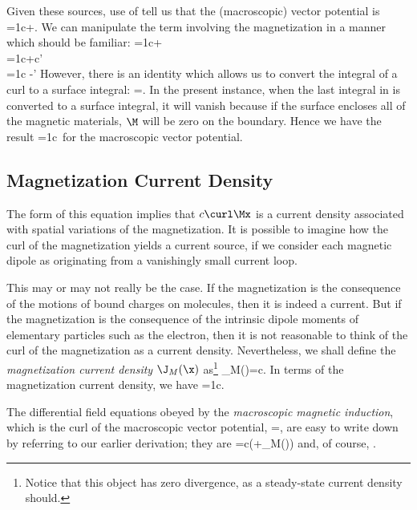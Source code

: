 {Given these sources, use of  tell us that the (macroscopic)
vector potential is
\beq
\Ax=\frac1c\inivp\leb\frac\Jxp\xxpa+\rib.
\eeq
We can manipulate the term involving the magnetization in a manner which
should be familiar:
\beqa
\Ax=\frac1c\inivp\lec\frac\Jxp\xxpa+\ric
\nonumber\\=\frac1c\inivp\lec\frac\Jxp\xxpa+c\Mxp\times\grad'\lep{}\xxpa
\rip\ric\nonumber\\=\frac1c\inivp\lec{}\xxpa\ric
-\inivp\grad'\times\lep\frac\Mxp\xxpa\rip
\eeqa
However, there is an identity which allows us to convert the integral of a
curl to a surface integral:
\beq
\inv\curl\V=\inac\nn\times\V.
\eeq
In the present instance, when the last integral in  is converted to a
surface integral, it will vanish because if the surface encloses all of the
magnetic materials, $\M$ will be zero on the boundary. Hence we have the
result
\beq
\Ax=\frac1c\inivp\,\xxpa
\eeq
for the macroscopic vector potential.

\subsection{Magnetization Current Density}

The form of this equation implies that $c\curl\Mx$ is a current density 
associated with spatial variations of the magnetization. 
It is possible to imagine how the curl of the magnetization yields a current
source, if we consider each magnetic dipole as originating from a vanishingly
small current loop.

\centerline{}

\noindent This may or may not
really be the case. If the magnetization is the consequence of the motions of
bound charges on molecules, then it is indeed a current. But if the
magnetization is the consequence of the intrinsic dipole moments of elementary
particles such as the electron, then it is not reasonable to think of the curl
of the magnetization as a current density. Nevertheless, we shall define
the {\em magnetization current density} $\J_M(\x)$ as\footnote{Notice that
this object has zero divergence, as a steady-state current density should.}
\beq
\J_M(\x)=c\curl\Mx.
\eeq
In terms of the magnetization current density, we have
\beq
\Ax=\frac1c\inivp{}\xxpa.
\eeq

The differential field equations obeyed by the {\em macroscopic magnetic
induction}, which is the curl of the macroscopic vector potential,
\beq
\Bx=\curl\Ax,
\eeq
are easy to write down by referring to our earlier derivation; they are
\beq
\curl\Bx=\frac{4\pi}c(\Jx+\J_M(\x))
\eeq
and, of course,
\beq
\div{}.
\eeq

}
